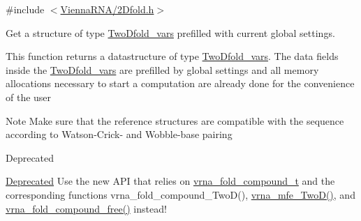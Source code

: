 {\ttfamily \#include $<$\hyperlink{2Dfold_8h}{Vienna\-R\-N\-A/2\-Dfold.\-h}$>$}



Get a structure of type \hyperlink{group__kl__neighborhood__mfe_structTwoDfold__vars}{Two\-Dfold\-\_\-vars} prefilled with current global settings. 

This function returns a datastructure of type \hyperlink{group__kl__neighborhood__mfe_structTwoDfold__vars}{Two\-Dfold\-\_\-vars}. The data fields inside the \hyperlink{group__kl__neighborhood__mfe_structTwoDfold__vars}{Two\-Dfold\-\_\-vars} are prefilled by global settings and all memory allocations necessary to start a computation are already done for the convenience of the user

\begin{DoxyNote}{Note}
Make sure that the reference structures are compatible with the sequence according to Watson-\/\-Crick-\/ and Wobble-\/base pairing
\end{DoxyNote}
\begin{DoxyRefDesc}{Deprecated}
\item[\hyperlink{deprecated__deprecated000002}{Deprecated}]Use the new A\-P\-I that relies on \hyperlink{group__fold__compound_ga1b0cef17fd40466cef5968eaeeff6166}{vrna\-\_\-fold\-\_\-compound\-\_\-t} and the corresponding functions vrna\-\_\-fold\-\_\-compound\-\_\-\-Two\-D(), \hyperlink{group__kl__neighborhood__mfe_ga243c288b463147352829df04de6a2f77}{vrna\-\_\-mfe\-\_\-\-Two\-D()}, and \hyperlink{group__fold__compound_gadded6039d63f5d6509836e20321534ad}{vrna\-\_\-fold\-\_\-compound\-\_\-free()} instead!\end{DoxyRefDesc}



